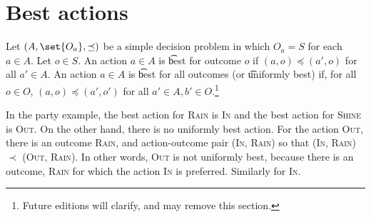 \section*{Best actions}

Let $(A, \set{O_a}, \preceq)$ be a simple decision problem in which $O_a = S$ for each $a \in A$.
Let $o \in S$.
An action $a \in A$ is \t{best for outcome $o$} if $(a, o) \preceq (a', o)$ for all $a' \in A$.
An action $a \in A$ is \t{best for all outcomes} (or \t{uniformly best}) if, for all $o \in O$, $(a, o) \preceq (a', o')$ for all $a' \in A, b' \in O$.\footnote{Future editions will clarify, and may remove this section.}

In the party example, the best action for \textsc{Rain} is \textsc{In} and the best action for \textsc{Shine} is \textsc{Out}.
On the other hand, there is no uniformly best action.
For the action \textsc{Out}, there is an outcome \textsc{Rain}, and action-outcome pair (\textsc{In}, \textsc{Rain}) so that (\textsc{In}, \textsc{Rain}) $\prec$ (\textsc{Out}, \textsc{Rain}).
In other words, \textsc{Out} is not uniformly best, because there is an outcome, \textsc{Rain} for which the action \textsc{In} is preferred.
Similarly for \textsc{In}.
